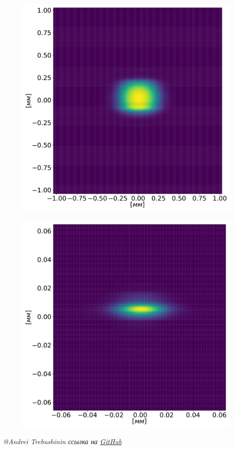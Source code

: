 \documentclass[14pt, hyperref = {colorlinks},xcolor=table ]{beamer}
\begin{document}
\begin{frame}
\begin{figure}[h]
\begin{minipage}[h]{0.32\linewidth}
		\raggedright{\includegraphics[width=0.99\linewidth]{pic/3_harm_after_DCM_2d.pdf}}
	\end{minipage}
	\begin{minipage}[h]{0.32\linewidth}
		\raggedright{\includegraphics[width=0.99\linewidth]{pic/3_harm_after_Sph_Mir_2d.pdf}}
	\end{minipage}
\end{figure}

\vspace{0pt}	
\tiny{\textit{@Andrei Trebushinin ссылка на \href{https://github.com/TrebAndrew/thesis_andrei/tree/dev}{GitHub}}}
\end{frame}
\end{document}
